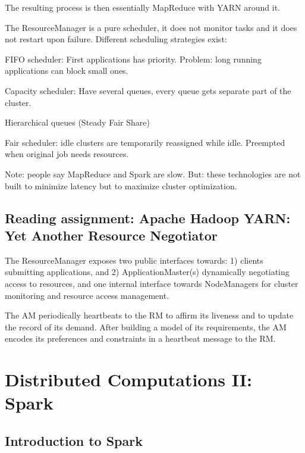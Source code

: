 \documentclass[11pt,oneside,a4paper]{article}
\begin{document}
The resulting process is then essentially MapReduce with YARN around it.

The ResourceManager is a pure scheduler, it does not monitor tasks and it does not restart upon failure. Different scheduling strategies exist:

\begin{compactitem}
\item FIFO scheduler: First applications has priority. Problem: long running applications can block small ones.
\item Capacity scheduler: Have several queues, every queue gets separate part of the cluster.
\item Hierarchical queues (Steady Fair Share)
\item Fair scheduler: idle clusters are temporarily reassigned while idle. Preempted when original job needs resources. 
\end{compactitem}

Note: people say MapReduce and Spark are slow. But: these technologies are not built to minimize latency but to maximize cluster optimization.

\subsection{Reading assignment: Apache Hadoop YARN: Yet Another Resource Negotiator}

\begin{compactitem}
\item The ResourceManager exposes two public interfaces towards: 1) clients submitting applications, and 2) ApplicationMaster(s) dynamically negotiating access to resources, and one internal interface towards NodeManagers for cluster monitoring and resource access management.
\item The AM periodically heartbeats to the RM to affirm its liveness and to update the record of its demand. After building a model of its requirements, the AM encodes its preferences and constraints in a heartbeat message to the RM.
\end{compactitem}



\newpage

\section{Distributed Computations II: Spark}

\subsection{Introduction to Spark}
\end{document}
